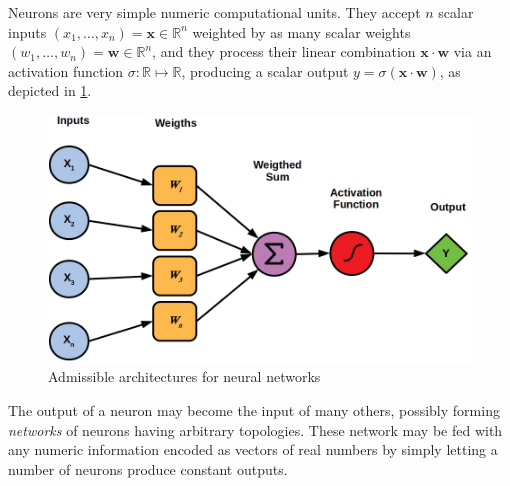 \documentclass[12pt,a4paper,openright,twoside]{book}
\begin{document}
Neurons are very simple numeric computational units.
%
They accept $n$ scalar inputs $(x_1, \ldots, x_n) = \mathbf{x} \in \mathbb{R}^n$ weighted by as many scalar weights $(w_1, \ldots, w_n) = \mathbf{w} \in \mathbb{R}^n$, and they process their linear combination $\mathbf{x} \cdot \mathbf{w}$ via an activation function \cite{enwiki:ActivationFunctions} $\sigma : \mathbb{R} \mapsto \mathbb{R}$, producing a scalar output $y = \sigma(\mathbf{x} \cdot \mathbf{w})$, as depicted in \cref{fig:neuron}.
%
\begin{figure}
    \centering
    \includegraphics[width=.6\linewidth]{figures/neuron.png}
    \caption{Admissible architectures for neural networks \cite{VanVeenL2019}}
    \label{fig:neuron}
\end{figure}
%
The output of a neuron may become the input of many others, possibly forming \emph{networks} of neurons having arbitrary topologies.
%
These network may be fed with any numeric information encoded as vectors of real numbers by simply letting a number of neurons produce constant outputs.
\end{document}
